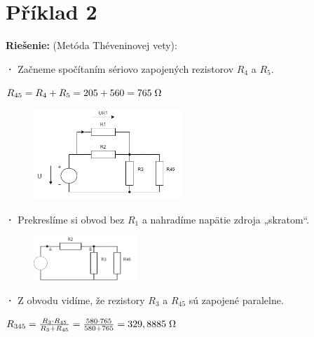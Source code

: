 \section{Příklad 2}

\begin{large}
\textbf{Riešenie:} (Metóda Théveninovej vety):\\
\end{large}

\textbf{·}
Začneme spočítaním sériovo zapojených rezistorov $R_4$ a $R_5$.

\begin{center}
$R_{45} = R_{4} + R_{5} = 205 + 560 = {765} \hspace{0,1cm} \SI{}{\ohm}$
\end{center}

\begin{figure}[h!]
    \centering
    \includegraphics[width=0.5\textwidth]{IEL-Project/pictures/Pr2_1.png}
\end{figure}

\textbf{·}
Prekreslíme si obvod bez $R_1$ a nahradíme napätie zdroja „skratom“.

\begin{figure}[h!]
    \centering
    \includegraphics[width=0.35\textwidth]{IEL-Project/pictures/Pr2_2.png}
\end{figure}

\textbf{·}
Z obvodu vidíme, že rezistory $R_3$ a $R_{45}$ sú zapojené paralelne.

\begin{center}
$R_{345} = \frac{R_3 \cdot R_{45}}{R_3 + R_{45}} = \frac{580 \cdot 765}{580 + 765} = {329,8885} \hspace{0,1cm} \SI{}{\ohm}$
\end{center}

